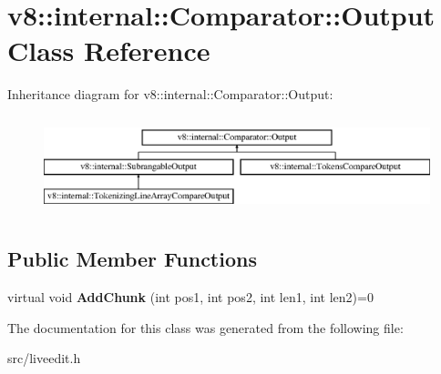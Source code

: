 \hypertarget{classv8_1_1internal_1_1_comparator_1_1_output}{}\section{v8\+:\+:internal\+:\+:Comparator\+:\+:Output Class Reference}
\label{classv8_1_1internal_1_1_comparator_1_1_output}
Inheritance diagram for v8\+:\+:internal\+:\+:Comparator\+:\+:Output\+:\begin{figure}[H]
\begin{center}
\leavevmode
\includegraphics[height=2.866894cm]{classv8_1_1internal_1_1_comparator_1_1_output}
\end{center}
\end{figure}
\subsection*{Public Member Functions}
\begin{DoxyCompactItemize}
\item 
\hypertarget{classv8_1_1internal_1_1_comparator_1_1_output_a95429725e46fdf84692680efcd14e479}{}virtual void {\bfseries Add\+Chunk} (int pos1, int pos2, int len1, int len2)=0\label{classv8_1_1internal_1_1_comparator_1_1_output_a95429725e46fdf84692680efcd14e479}

\end{DoxyCompactItemize}


The documentation for this class was generated from the following file\+:\begin{DoxyCompactItemize}
\item 
src/liveedit.\+h\end{DoxyCompactItemize}
